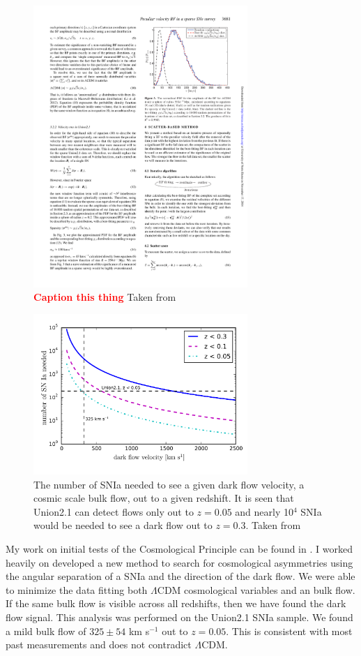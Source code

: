 \documentclass[apj, iop]{emulateapj}
\newcommand{\sn}{SNIa}
\newcommand{\todo}[1]{\textbf{\textcolor{red}{#1}}}
\newcommand{\lcdm}{$\Lambda$CDM}     %
\begin{document}
\begin{figure}
	\includegraphics[width=3.2in]{Rathaus2013.pdf} 
    \caption{\todo{Caption this thing} 
    Taken from \cite{Rathaus13}}
	\label{f:bf-w-sn} 
\end{figure}

\begin{figure}
	\includegraphics[width=3.2in]{what_dataset_size_v_velocity.pdf} 
    \caption{The number of \sn{} needed to see a given dark flow velocity, a
	cosmic scale bulk flow, out to a given redshift. It is seen that Union2.1 
	can detect flows only out to $z=0.05$ and nearly 10$^4$ \sn{} would be 
	needed to see a dark flow out to $z=0.3$. Taken from \cite{Mathews16}}
	\label{f:sn-needed} 
\end{figure}

My work on initial tests of the Cosmological Principle can be found in
\cite{Mathews16}. I worked heavily on developed a new method to search for
cosmological asymmetries using the angular separation of a \sn{} and the
direction of the dark flow. We were able to minimize the data fitting both
\lcdm{} cosmological variables and  an bulk flow. If the same bulk flow is
visible across all redshifts, then we have found the dark flow signal. This
analysis was performed on the Union2.1 \citep{Suzuki12} \sn{} sample. We found a
mild bulk flow of $325 \pm 54$ km s$^{-1}$ out to $z = 0.05$. This is consistent
with most past measurements and does not contradict \lcdm{}.
\end{document}

